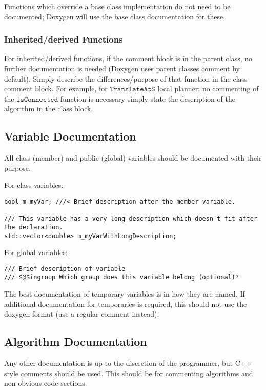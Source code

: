 \documentclass[12pt]{article}
\begin{document}
Functions which override a base class implementation do not need to be
documented; Doxygen will use the base class documentation for these.

\subsubsection{Inherited/derived Functions}
For inherited/derived functions, if the comment block is in the parent class,
no further documentation is needed (Doxygen uses parent classes comment by
default). Simply describe the differences/purpose of that function in the class
comment block. For example, for $\mathtt{TranslateAtS}$ local planner: no
commenting of the $\mathtt{IsConnected}$ function is necessary simply state the
description of the algorithm in the class block.

\subsection{Variable Documentation}

All class (member) and public (global) variables should be documented with their
purpose.

For class variables:
\begin{lstlisting}
bool m_myVar; ///< Brief description after the member variable.

/// This variable has a very long description which doesn't fit after the declaration.
std::vector<double> m_myVarWithLongDescription;
\end{lstlisting}

For global variables:
\begin{lstlisting}[mathescape]
/// Brief description of variable
/// $@$ingroup Which group does this variable belong (optional)?
\end{lstlisting}

The best documentation of temporary variables is in how they are named. If
additional documentation for temporaries is required, this should not use the
doxygen format (use a regular comment instead).

\subsection{Algorithm Documentation}

Any other documentation is up to the discretion of the programmer, but C++ style
comments should be used. This should be for commenting algorithms and
non-obvious code sections.
\end{document}
